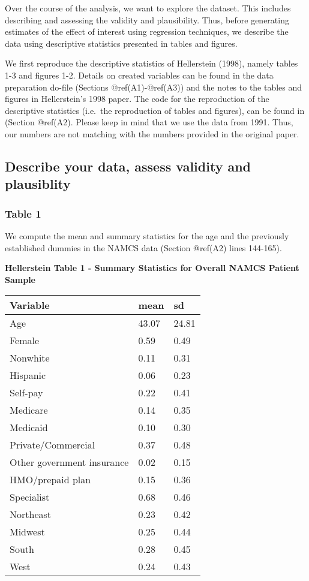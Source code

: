 \documentclass[
]{book}
\begin{document}
Over the course of the analysis, we want to explore the dataset. This
includes describing and assessing the validity and plausibility. Thus,
before generating estimates of the effect of interest using regression
techniques, we describe the data using descriptive statistics presented
in tables and figures.

We first reproduce the descriptive statistics of Hellerstein (1998),
namely tables 1-3 and figures 1-2. Details on created variables can be
found in the data preparation do-file (Sections @ref(A1)-@ref(A3)) and
the notes to the tables and figures in Hellerstein's 1998 paper. The
code for the reproduction of the descriptive statistics (i.e.~the
reproduction of tables and figures), can be found in (Section @ref(A2).
Please keep in mind that we use the data from 1991. Thus, our numbers
are not matching with the numbers provided in the original paper.

\hypertarget{describe-your-data-assess-validity-and-plausiblity-1}{%
\subsection{Describe your data, assess validity and
plausiblity}\label{describe-your-data-assess-validity-and-plausiblity-1}}

\hypertarget{table-1}{%
\subsubsection{Table 1}\label{table-1}}

We compute the mean and summary statistics for the age and the
previously established dummies in the NAMCS data (Section @ref(A2) lines
144-165).

\textbf{Hellerstein Table 1 - Summary Statistics for Overall NAMCS
Patient Sample}

\begin{longtable}[]{@{}lll@{}}
\toprule
Variable & mean & sd\tabularnewline
\midrule
\endhead
Age & 43.07 & 24.81\tabularnewline
Female & 0.59 & 0.49\tabularnewline
Nonwhite & 0.11 & 0.31\tabularnewline
Hispanic & 0.06 & 0.23\tabularnewline
Self-pay & 0.22 & 0.41\tabularnewline
Medicare & 0.14 & 0.35\tabularnewline
Medicaid & 0.10 & 0.30\tabularnewline
Private/Commercial & 0.37 & 0.48\tabularnewline
Other government insurance & 0.02 & 0.15\tabularnewline
HMO/prepaid plan & 0.15 & 0.36\tabularnewline
Specialist & 0.68 & 0.46\tabularnewline
Northeast & 0.23 & 0.42\tabularnewline
Midwest & 0.25 & 0.44\tabularnewline
South & 0.28 & 0.45\tabularnewline
West & 0.24 & 0.43\tabularnewline
\bottomrule
\end{longtable}
\end{document}
